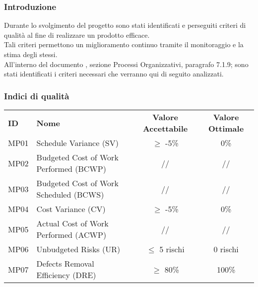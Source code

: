 

\subsubsection{Introduzione}
Durante lo svolgimento del progetto sono stati identificati e perseguiti criteri di qualità al fine di realizzare un prodotto efficace. \\
Tali criteri permettono un miglioramento continuo tramite il monitoraggio e la stima degli stessi.\\
All'interno del documento , sezione Processi Organizzativi, paragrafo 7.1.9; sono stati identificati i criteri necessari che verranno qui di seguito analizzati.
\subsubsection{Indici di qualità}

\begin{table} [h!]
	\begin{center}
		\begin{tabular} {m{2 cm} m{7 cm} c c }
			\rowcolor{lightgray}
			\textbf{ID} & \textbf{Nome}& \textbf{Valore Accettabile} & \textbf{Valore Ottimale}\\
			MP01 & Schedule Variance (SV)   & $\geq$ -5\%    & 0\% \\
			MP02 & Budgeted Cost of Work Performed (BCWP) & //           & // \\
			MP03 & Budgeted Cost of Work Scheduled (BCWS) & //           & // \\
			MP04 & Cost Variance (CV)   & $\geq$ -5\% & 0\% \\
			MP05 & Actual Cost of Work Performed (ACWP) & //           & // \\
			MP06 & Unbudgeted Risks (UR)   & $\leq$ 5 rischi & 0 rischi\\
			MP07 & Defects Removal Efficiency (DRE)  & $\geq$  80\% & 100\%\\

		\end{tabular}
	\end{center}
\end{table}





